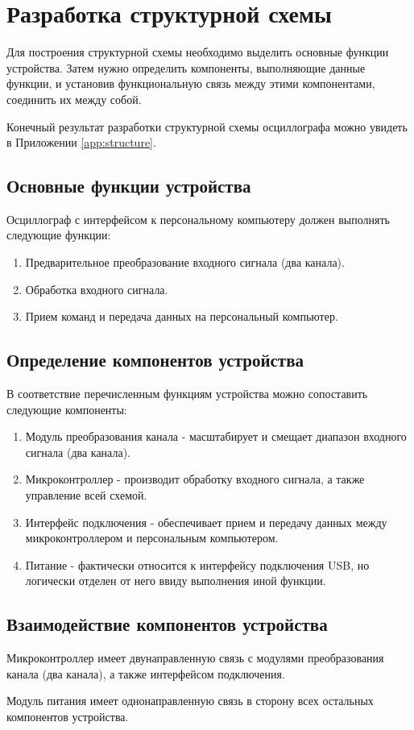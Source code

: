 \section{Разработка структурной схемы}

Для построения структурной схемы необходимо выделить основные функции устройства. Затем нужно определить компоненты, выполняющие данные функции, и установив функциональную связь между этими компонентами, соединить их между собой.

Конечный результат разработки структурной схемы осциллографа можно увидеть в Приложении \ref{app:structure}.

\subsection{Основные функции устройства}

Осциллограф с интерфейсом к персональному компьютеру должен выполнять следующие функции:
\begin{enumerate}
    \item Предварительное преобразование входного сигнала (два канала).
    \item Обработка входного сигнала.
    \item Прием команд и передача данных на персональный компьютер.
\end{enumerate}

\subsection{Определение компонентов устройства}

В соответствие перечисленным функциям устройства можно сопоставить следующие компоненты:
\begin{enumerate}
    \item Модуль преобразования канала - масштабирует и смещает диапазон входного сигнала (два канала).
    \item Микроконтроллер - производит обработку входного сигнала, а также управление всей схемой.
    \item Интерфейс подключения - обеспечивает прием и передачу данных между микроконтроллером и персональным компьютером.
    \item Питание - фактически относится к интерфейсу подключения USB, но логически отделен от него ввиду выполнения иной функции.
\end{enumerate}

\subsection{Взаимодействие компонентов устройства}

Микроконтроллер имеет двунаправленную связь с модулями преобразования канала (два канала), а также интерфейсом подключения. 

Модуль питания имеет однонаправленную связь в сторону всех остальных компонентов устройства.